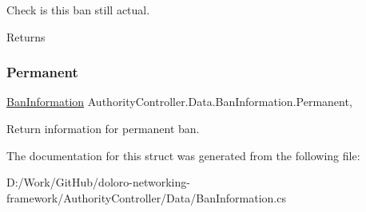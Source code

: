Check is this ban still actual. 

\begin{DoxyReturn}{Returns}

\end{DoxyReturn}
\mbox{\label{struct_authority_controller_1_1_data_1_1_ban_information_aee645f20f1abb308cd54a640f94cbdf5}} 
\subsubsection{\texorpdfstring{Permanent}{Permanent}}
{\footnotesize\ttfamily \mbox{\hyperlink{struct_authority_controller_1_1_data_1_1_ban_information}{Ban\+Information}} Authority\+Controller.\+Data.\+Ban\+Information.\+Permanent\hspace{0.3cm}{\ttfamily [static]}, {\ttfamily [get]}}



Return information for permanent ban. 



The documentation for this struct was generated from the following file\+:\begin{DoxyCompactItemize}
\item 
D\+:/\+Work/\+Git\+Hub/doloro-\/networking-\/framework/\+Authority\+Controller/\+Data/Ban\+Information.\+cs\end{DoxyCompactItemize}
